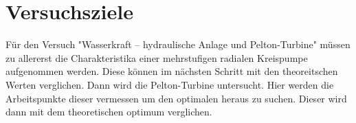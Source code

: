 \section{Versuchsziele}
Für den Versuch "Wasserkraft – hydraulische Anlage und Pelton-Turbine" müssen zu allererst die Charakteristika einer mehrstufigen radialen Kreispumpe aufgenommen werden. Diese können im nächsten Schritt mit den theoreitschen Werten verglichen. Dann wird die Pelton-Turbine untersucht. Hier werden die Arbeitspunkte dieser vermessen um den optimalen heraus zu suchen. Dieser wird dann mit dem theoretischen optimum verglichen.
